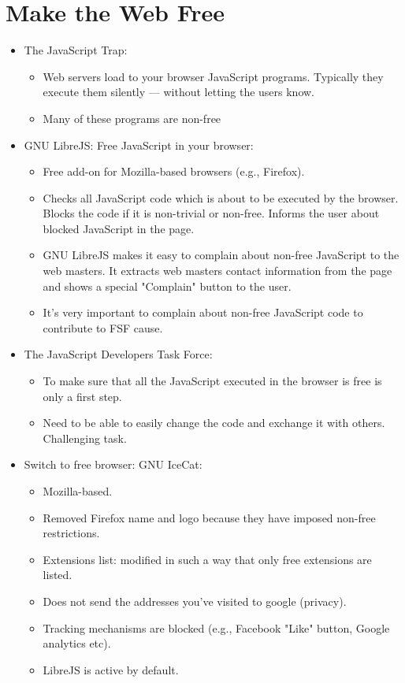 \documentclass[twoside,openright]{report}
\begin{document}
\section{Make the Web Free}
\begin{itemize}
\item    The JavaScript Trap:
\begin{itemize}
 \item        Web servers load to your browser JavaScript programs. Typically they execute them silently --- without letting the users know.
 \item        Many of these programs are non-free
\end{itemize}
 \item    GNU LibreJS: Free JavaScript in your browser:
\begin{itemize}
 \item        Free add-on for Mozilla-based browsers (e.g., Firefox).
 \item        Checks all JavaScript code which is about to be executed by the browser. Blocks the code if it is non-trivial or non-free. Informs the user about blocked JavaScript in the page.
 \item        GNU LibreJS makes it easy to complain about non-free JavaScript to the web masters. It extracts web masters contact information from the page and shows a special "Complain" button to the user.
 \item        It's very important to complain about non-free JavaScript code to contribute to FSF cause.
\end{itemize}
 \item    The JavaScript Developers Task Force:
\begin{itemize}
 \item        To make sure that all the JavaScript executed in the browser is free is only a first step.
 \item        Need to be able to easily change the code and exchange it with others. Challenging task.
\end{itemize}
 \item    Switch to free browser: GNU IceCat:
\begin{itemize}
 \item        Mozilla-based.
 \item        Removed Firefox name and logo because they have imposed non-free restrictions.
 \item        Extensions list: modified in such a way that only free extensions are listed.
 \item        Does not send the addresses you've visited to google (privacy).
 \item        Tracking mechanisms are blocked (e.g., Facebook "Like" button, Google analytics etc).
 \item        LibreJS is active by default.
\end{itemize}
\end{itemize}
\end{document}
